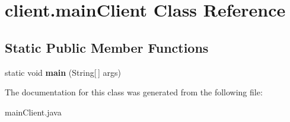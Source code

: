 \hypertarget{classclient_1_1mainClient}{}\section{client.\+main\+Client Class Reference}
\label{classclient_1_1mainClient}
\subsection*{Static Public Member Functions}
\begin{DoxyCompactItemize}
\item 
\mbox{\label{classclient_1_1mainClient_a0b28fb87463204b64524e5261b283d23}} 
static void {\bfseries main} (String\mbox{[}$\,$\mbox{]} args)
\end{DoxyCompactItemize}


The documentation for this class was generated from the following file\+:\begin{DoxyCompactItemize}
\item 
main\+Client.\+java\end{DoxyCompactItemize}
